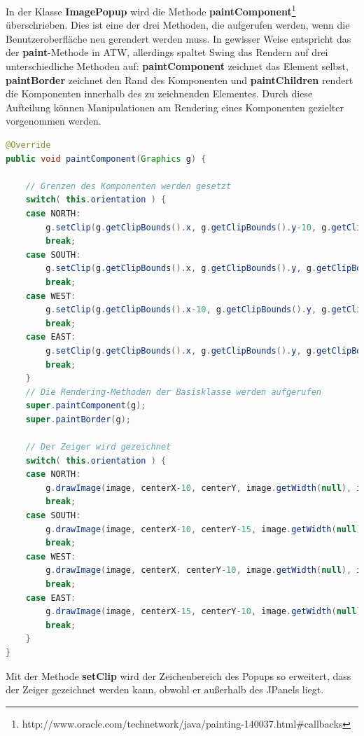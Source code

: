 In der Klasse \textbf{ImagePopup} wird die Methode \textbf{paintComponent}\footnote{http://www.oracle.com/technetwork/java/painting-140037.html\#callbacks} überschrieben. Dies ist eine der drei Methoden, die aufgerufen werden, wenn die Benutzeroberfläche neu gerendert werden muss. In gewisser Weise entspricht das der \textbf{paint}-Methode in ATW, allerdings spaltet Swing das Rendern auf drei unterschiedliche Methoden auf: \textbf{paintComponent} zeichnet das Element selbst, \textbf{paintBorder} zeichnet den Rand des Komponenten und \textbf{paintChildren} rendert die Komponenten innerhalb des zu zeichnenden Elementes. Durch diese Aufteilung können Manipulationen am Rendering eines Komponenten gezielter vorgenommen werden.

\begin{lstlisting}[language=JAVA]
@Override
public void paintComponent(Graphics g) {
        
    // Grenzen des Komponenten werden gesetzt
    switch( this.orientation ) {
    case NORTH:
    	g.setClip(g.getClipBounds().x, g.getClipBounds().y-10, g.getClipBounds().width, g.getClipBounds().height+10);
    	break;
    case SOUTH:
    	g.setClip(g.getClipBounds().x, g.getClipBounds().y, g.getClipBounds().width+10, g.getClipBounds().height+10);
    	break;
    case WEST:
    	g.setClip(g.getClipBounds().x-10, g.getClipBounds().y, g.getClipBounds().width+10, g.getClipBounds().height);
    	break;
    case EAST:
    	g.setClip(g.getClipBounds().x, g.getClipBounds().y, g.getClipBounds().width+10, g.getClipBounds().height);
    	break;
    }
    // Die Rendering-Methoden der Basisklasse werden aufgerufen
    super.paintComponent(g);
    super.paintBorder(g);
    	
    // Der Zeiger wird gezeichnet
    switch( this.orientation ) {
    case NORTH:
    	g.drawImage(image, centerX-10, centerY, image.getWidth(null), image.getHeight(null), this);
    	break;
    case SOUTH:
    	g.drawImage(image, centerX-10, centerY-15, image.getWidth(null), image.getHeight(null), this);
    	break;
    case WEST:
    	g.drawImage(image, centerX, centerY-10, image.getWidth(null), image.getHeight(null), this);
    	break;
    case EAST:
    	g.drawImage(image, centerX-15, centerY-10, image.getWidth(null), image.getHeight(null), this);
    	break;
    }
}
\end{lstlisting}

Mit der Methode \textbf{setClip} wird der Zeichenbereich des Popups so erweitert, dass der Zeiger gezeichnet werden kann, obwohl er außerhalb des JPanels liegt.


